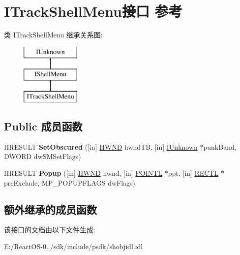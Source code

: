 \hypertarget{interface_i_track_shell_menu}{}\section{I\+Track\+Shell\+Menu接口 参考}
\label{interface_i_track_shell_menu}
类 I\+Track\+Shell\+Menu 继承关系图\+:\begin{figure}[H]
\begin{center}
\leavevmode
\includegraphics[height=3.000000cm]{interface_i_track_shell_menu}
\end{center}
\end{figure}
\subsection*{Public 成员函数}
\begin{DoxyCompactItemize}
\item 
\mbox{\label{interface_i_track_shell_menu_a1d291b1c51c7bd76ca212cdf86501feb}} 
H\+R\+E\+S\+U\+LT {\bfseries Set\+Obscured} (\mbox{[}in\mbox{]} \hyperlink{interfacevoid}{H\+W\+ND} hwnd\+TB, \mbox{[}in\mbox{]} \hyperlink{interface_i_unknown}{I\+Unknown} $\ast$punk\+Band, D\+W\+O\+RD dw\+S\+M\+Set\+Flags)
\item 
\mbox{\label{interface_i_track_shell_menu_a02b6a3b4adf5336f0c4f7ca14cd1c5a9}} 
H\+R\+E\+S\+U\+LT {\bfseries Popup} (\mbox{[}in\mbox{]} \hyperlink{interfacevoid}{H\+W\+ND} hwnd, \mbox{[}in\mbox{]} \hyperlink{struct___p_o_i_n_t_l}{P\+O\+I\+N\+TL} $\ast$ppt, \mbox{[}in\mbox{]} \hyperlink{struct___r_e_c_t_l}{R\+E\+C\+TL} $\ast$prc\+Exclude, M\+P\+\_\+\+P\+O\+P\+U\+P\+F\+L\+A\+GS dw\+Flags)
\end{DoxyCompactItemize}
\subsection*{额外继承的成员函数}


该接口的文档由以下文件生成\+:\begin{DoxyCompactItemize}
\item 
E\+:/\+React\+O\+S-\/0../sdk/include/psdk/shobjidl.\+idl\end{DoxyCompactItemize}
